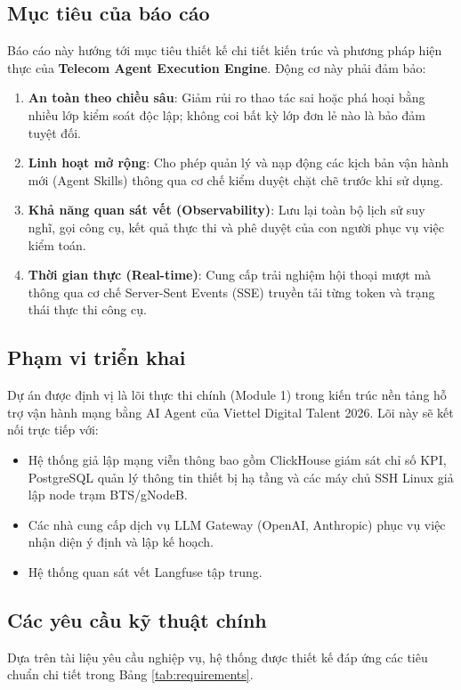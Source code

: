 \documentclass[12pt,a4paper]{article}
\begin{document}
\subsection{Mục tiêu của báo cáo}
Báo cáo này hướng tới mục tiêu thiết kế chi tiết kiến trúc và phương pháp hiện thực của \textbf{Telecom Agent Execution Engine}. Động cơ này phải đảm bảo:
\begin{enumerate}
    \item \textbf{An toàn theo chiều sâu}: Giảm rủi ro thao tác sai hoặc phá hoại bằng nhiều lớp kiểm soát độc lập; không coi bất kỳ lớp đơn lẻ nào là bảo đảm tuyệt đối.
    \item \textbf{Linh hoạt mở rộng}: Cho phép quản lý và nạp động các kịch bản vận hành mới (Agent Skills) thông qua cơ chế kiểm duyệt chặt chẽ trước khi sử dụng.
    \item \textbf{Khả năng quan sát vết (Observability)}: Lưu lại toàn bộ lịch sử suy nghĩ, gọi công cụ, kết quả thực thi và phê duyệt của con người phục vụ việc kiểm toán.
    \item \textbf{Thời gian thực (Real-time)}: Cung cấp trải nghiệm hội thoại mượt mà thông qua cơ chế Server-Sent Events (SSE) truyền tải từng token và trạng thái thực thi công cụ.
\end{enumerate}

\subsection{Phạm vi triển khai}
Dự án được định vị là lõi thực thi chính (Module 1) trong kiến trúc nền tảng hỗ trợ vận hành mạng bằng AI Agent của Viettel Digital Talent 2026. Lõi này sẽ kết nối trực tiếp với:
\begin{itemize}
    \item Hệ thống giả lập mạng viễn thông bao gồm ClickHouse giám sát chỉ số KPI, PostgreSQL quản lý thông tin thiết bị hạ tầng và các máy chủ SSH Linux giả lập node trạm BTS/gNodeB.
    \item Các nhà cung cấp dịch vụ LLM Gateway (OpenAI, Anthropic) phục vụ việc nhận diện ý định và lập kế hoạch.
    \item Hệ thống quan sát vết Langfuse tập trung.
\end{itemize}

\subsection{Các yêu cầu kỹ thuật chính}
Dựa trên tài liệu yêu cầu nghiệp vụ, hệ thống được thiết kế đáp ứng các tiêu chuẩn chi tiết trong Bảng \ref{tab:requirements}.
\end{document}
